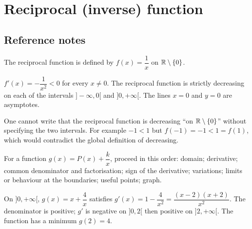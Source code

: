 
\chapter{Reciprocal (inverse) function}
\section{Reference notes}
The reciprocal function is defined by $f(x)=\dfrac1x$ on $\mathbb{R}\setminus\{0\}$.

\begin{center}
\end{center}

\begin{retenir}
$f'(x)=-\dfrac1{x^2}<0$ for every $x\neq0$. The reciprocal function is strictly decreasing on each of the intervals $]-\infty,0[$ and $]0,+\infty[$. The lines $x=0$ and $y=0$ are asymptotes.
\end{retenir}

\begin{erreur}
One cannot write that the reciprocal function is decreasing ``on $\mathbb{R}\setminus\{0\}$'' without specifying the two intervals. For example $-1<1$ but $f(-1)=-1<1=f(1)$, which would contradict the global definition of decreasing.
\end{erreur}

For a function $g(x)=P(x)+\dfrac{k}{x}$, proceed in this order: domain; derivative; common denominator and factorisation; sign of the derivative; variations; limits or behaviour at the boundaries; useful points; graph.

\begin{exemple}
On $]0,+\infty[$, $g(x)=x+\dfrac4x$ satisfies $g'(x)=1-\dfrac4{x^2}=\dfrac{(x-2)(x+2)}{x^2}$. The denominator is positive; $g'$ is negative on $]0,2[$ then positive on $]2,+\infty[$. The function has a minimum $g(2)=4$.
\end{exemple}

